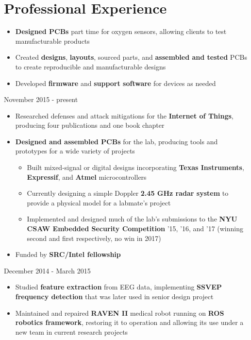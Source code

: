 \documentclass{my_resume}
\begin{document}
\section{Professional Experience}
\begin{flushleft}
  \begin{itemize}[noitemsep]
  \item \textbf{Designed PCBs} part time for oxygen sensors, allowing clients to test manufacturable products
  \item Created \textbf{designs}, \textbf{layouts}, sourced parts, and \textbf{assembled and tested} PCBs to create reproducible and manufacturable designs
  \item Developed \textbf{firmware} and \textbf{support software} for devices as needed
\end{itemize}
\end{flushleft}
    {November 2015 - present}
\begin{flushleft}
\begin{itemize}[noitemsep]
  \item Researched defenses and attack mitigations for the \textbf{Internet of Things}, producing four publications and one book chapter
  \item \textbf{Designed and assembled PCBs} for the lab, producing tools and prototypes for a wide variety of projects
  \begin{itemize}[noitemsep]
    \item Built mixed-signal or digital designs incorporating \textbf{Texas Instruments}, \textbf{Expressif}, and \textbf{Atmel} microcontrollers
    \item Currently designing a simple Doppler \textbf{2.45 GHz radar system} to provide a physical model for a labmate's project
    \item Implemented and designed much of the lab's submissions to the \textbf{NYU CSAW Embedded Security Competition} '15, '16, and '17 (winning second and first respectively, no win in 2017)
  \end{itemize}
  \item Funded by \textbf{SRC/Intel fellowship}
\end{itemize}
\end{flushleft}
	{December 2014 - March 2015}
\begin{flushleft}
\begin{itemize}[noitemsep]
  \item Studied \textbf{feature extraction} from EEG data, implementing \textbf{SSVEP frequency detection} that was later used in senior design project
  \item Maintained and repaired \textbf{RAVEN II} medical robot running on \textbf{ROS robotics framework}, restoring it to operation and allowing its use under a new team in current research projects
\end{itemize}
\end{flushleft}
\end{document}
